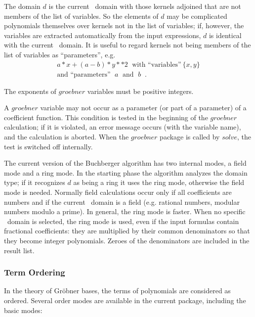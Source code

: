The domain $d$ is the current \REDUCE \  domain with those kernels
adjoined that are not members of the list of variables. So the
elements of $d$ may be complicated polynomials themselves over
kernels not in the list of variables; if, however, the variables are
extracted automatically from the input expressions, $d$ is identical
with the current \REDUCE \  domain. It is useful to regard kernels not
being members of the list of variables as ``parameters'', e.g.
\[
\begin{array}{c}
 a * x + (a - b) * y**2 \;\mbox{ with ``variables''}\ \{x,y\} \\
\mbox{and ``parameters''  $\;a\;$ and $\;b\;$}\;.
\end{array}
\]

The exponents of $groebner$ variables must be positive integers.

A $groebner$ variable may not occur as a parameter (or part
of a parameter) of a coefficient function. This condition is
tested in the beginning of the $groebner$ calculation; if it is
violated, an error message occurs (with the variable name), and the
calculation is aborted. When the $groebner$ package is called by
$solve$, the test is switched off internally.

The current version of the Buchberger algorithm has two internal
modes, a field mode and a ring mode. In the starting phase the
algorithm analyzes the domain type; if it recognizes $d$ as being a
ring it uses the ring mode, otherwise the field mode is needed.
Normally field calculations occur only if all coefficients are numbers
and if the current \REDUCE \  domain is a field (e.g. rational numbers,
modular numbers modulo a prime). In general, the ring mode is faster.
When no specific
\REDUCE \  domain is selected, the ring mode is used, even if the input
formulas contain fractional coefficients: they are multiplied by their
common denominators so that they become integer polynomials. Zeroes of the
denominators are included in the result list.

\subsubsection{Term Ordering} \par
In the theory of Gr\"obner bases, the terms of polynomials are
considered as ordered. Several order modes are available in
the current package, including the basic modes:

